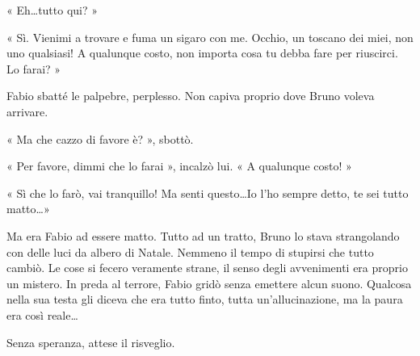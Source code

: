« Eh\ldots tutto qui? »

« Sì. Vienimi a trovare e fuma un sigaro con me. Occhio, un toscano dei miei, non uno qualsiasi! A qualunque costo, non importa cosa tu debba fare per riuscirci. Lo farai? »

Fabio sbatté le palpebre, perplesso. Non capiva proprio dove Bruno voleva arrivare.

« Ma che cazzo di favore è? », sbottò.

« Per favore, dimmi che lo farai », incalzò lui. « A qualunque costo! »

« Sì che lo farò, vai tranquillo! Ma senti questo\ldots Io l'ho sempre detto, te sei tutto matto\ldots »

Ma era Fabio ad essere matto. Tutto ad un tratto, Bruno lo stava strangolando con delle luci da albero di Natale. Nemmeno il tempo di stupirsi che tutto cambiò. Le cose si fecero veramente strane, il senso degli avvenimenti era proprio un mistero. In preda al terrore, Fabio gridò senza emettere alcun suono. Qualcosa nella sua testa gli diceva che era tutto finto, tutta un'allucinazione, ma la paura era così reale\ldots

Senza speranza, attese il risveglio.
